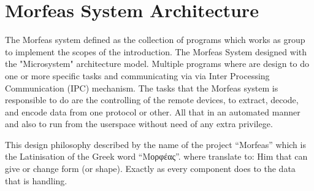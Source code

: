 \section{Morfeas System Architecture}
The Morfeas system defined as the collection of programs which works as group to implement the scopes of the introduction.
The Morfeas System designed with the "Microsystem" architecture model. Multiple programs where are design to do one or more specific tasks
and communicating via via Inter Processing Communication (IPC) mechanism.
The tasks that the Morfeas system is responsible to do are the controlling of the remote devices, to extract, decode, and encode data from one protocol or other.
All that in an automated manner and also to run from the userspace without need of any extra privilege.

This design philosophy described by the name of the project ``Morfeas'' which is the Latinisation of the Greek word
``Μορφέας''. where translate to: Him that can give or change form (or shape).
Exactly as every component does to the data that is handling.

